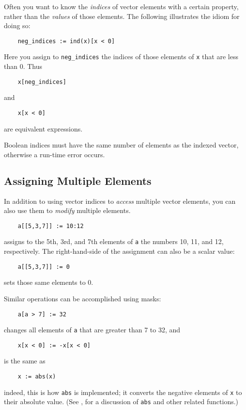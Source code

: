 Often you want to know the {\em indices} of vector elements with a
certain property, rather than the {\em values} of those elements.  The
following illustrates the idiom for doing so:
\begin{verbatim}
    neg_indices := ind(x)[x < 0]
\end{verbatim}
Here you assign to \verb+neg_indices+ the indices of those
elements of {\tt x} that are less than 0.  Thus
\begin{verbatim}
    x[neg_indices]
\end{verbatim}
and
\begin{verbatim}
    x[x < 0]
\end{verbatim}
are equivalent expressions.

Boolean
indices must have the same number of elements as the
indexed vector, otherwise a run-time error occurs.

\subsection{Assigning Multiple Elements}
\label{multiple-assign}

In addition to using vector indices to {\em access} multiple vector
elements, you can also use them to {\em modify} multiple elements.
\begin{verbatim}
    a[[5,3,7]] := 10:12
\end{verbatim}
assigns to the 5th, 3rd, and 7th elements of {\tt a} the numbers 10, 11, and
12, respectively.  The right-hand-side of the assignment can also be
a scalar value:
\begin{verbatim}
    a[[5,3,7]] := 0
\end{verbatim}
sets those same elements to 0.  

Similar operations can be accomplished using masks:
\begin{verbatim}
    a[a > 7] := 32
\end{verbatim}
changes all elements of {\tt a} that are greater than 7 to 32, and
\begin{verbatim}
    x[x < 0] := -x[x < 0]
\end{verbatim}
is the same as
\begin{verbatim}
    x := abs(x)
\end{verbatim}
indeed, this is how {\tt abs} is implemented; it converts the
negative elements of {\tt x} to their absolute value. (See
, for a discussion of {\tt abs} and other
related functions.)

